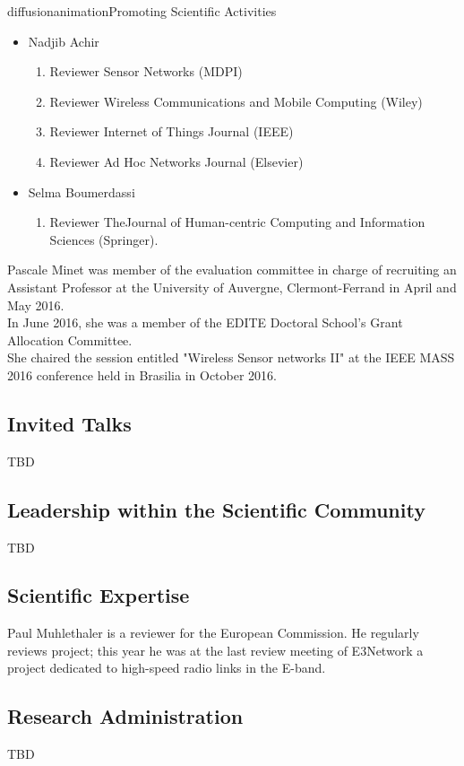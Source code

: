 \documentclass{ra2016}
\begin{document}
\begin{module}{diffusion}{animation}{Promoting Scientific Activities}
\begin{itemize}
\begin{enumerate}
        \end{enumerate}
    \item Nadjib Achir
        \begin{enumerate}
            \item Reviewer Sensor Networks (MDPI)
            \item Reviewer Wireless Communications and Mobile Computing (Wiley)
            \item Reviewer Internet of Things Journal (IEEE)
            \item Reviewer Ad Hoc Networks Journal (Elsevier)
        \end{enumerate}
     \item Selma Boumerdassi
				\begin{enumerate}
					\item Reviewer TheJournal of Human-centric Computing and Information Sciences (Springer).
				\end{enumerate}
\end{itemize}

Pascale Minet was member of the evaluation committee in charge of recruiting an Assistant Professor at the University of Auvergne, Clermont-Ferrand in April and May 2016.\\
In June 2016, she was a member of the EDITE Doctoral School's Grant Allocation Committee.\\
She chaired the session entitled "Wireless Sensor networks II" at the IEEE MASS 2016 conference held in Brasilia in October 2016.\\ 

\subsection{Invited Talks}

TBD
\subsection{Leadership within the Scientific Community}
TBD

\subsection{Scientific Expertise}

Paul Muhlethaler is a reviewer for the European Commission. He regularly reviews 
project; this year he was at the last review meeting of E3Network a project dedicated 
to high-speed radio links in the E-band. 

\subsection{Research Administration}
 
 TBD
 
\end{module}
\end{document}
